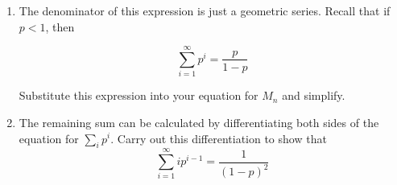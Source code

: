 \begin{activity}
\begin{exercises}
\begin{enumerate}
\begin{solution}
{					}\end{solution}
					
				\item The denominator of this expression is just a geometric series.  Recall that if $p < 1$, then 
		
			\begin{equation*}
				\sum_{i=1}^{\infty} p^i = \frac{p}{1-p}
			\end{equation*}
			
					Substitute this expression into your equation for $M_n$ and simplify.
					
					\begin{solution}\end{solution}
			
				\item The remaining sum can be calculated by differentiating both sides of the equation for $\sum_i p^i$.  Carry out this differentiation to show that
						\begin{equation*}
							\sum_{i=1}^{\infty} ip^{i-1} = \frac{1}{(1-p)^2}
						\end{equation*}
				
					\begin{solution}
\end{solution}
\end{enumerate}
\end{exercises}
\end{activity}
